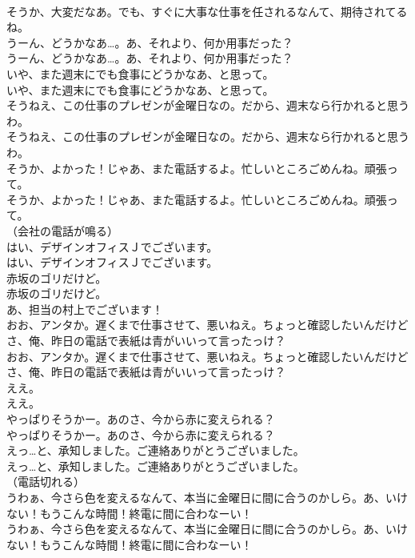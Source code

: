 \documentclass[8pt]{extreport}
\begin{document}
\begin{CJK}{UTF8}{min}
\\	そうか、大変だなあ。でも、すぐに大事な仕事を任されるなんて、期待されてるね。 
\\	うーん、どうかなあ…。あ、それより、何か用事だった？	
\\	うーん、どうかなあ…。あ、それより、何か用事だった？ 
\\	いや、また週末にでも食事にどうかなあ、と思って。	
\\	いや、また週末にでも食事にどうかなあ、と思って。 
\\	そうねえ、この仕事のプレゼンが金曜日なの。だから、週末なら行かれると思うわ。	
\\	そうねえ、この仕事のプレゼンが金曜日なの。だから、週末なら行かれると思うわ。 
\\	そうか、よかった！じゃあ、また電話するよ。忙しいところごめんね。頑張って。	
\\	そうか、よかった！じゃあ、また電話するよ。忙しいところごめんね。頑張って。 
\\	（会社の電話が鳴る）	
\\	はい、デザインオフィスＪでございます。	
\\	はい、デザインオフィスＪでございます。 
\\	赤坂のゴリだけど。	
\\	赤坂のゴリだけど。 
\\	あ、担当の村上でございます！	
\\	おお、アンタか。遅くまで仕事させて、悪いねえ。ちょっと確認したいんだけどさ、俺、昨日の電話で表紙は青がいいって言ったっけ？	
\\	おお、アンタか。遅くまで仕事させて、悪いねえ。ちょっと確認したいんだけどさ、俺、昨日の電話で表紙は青がいいって言ったっけ？ 
\\	ええ。	
\\	ええ。 
\\	やっぱりそうかー。あのさ、今から赤に変えられる？	
\\	やっぱりそうかー。あのさ、今から赤に変えられる？ 
\\	えっ…と、承知しました。ご連絡ありがとうございました。	
\\	えっ…と、承知しました。ご連絡ありがとうございました。 
\\	（電話切れる）	
\\	うわぁ、今さら色を変えるなんて、本当に金曜日に間に合うのかしら。あ、いけない！もうこんな時間！終電に間に合わなーい！	
\\	うわぁ、今さら色を変えるなんて、本当に金曜日に間に合うのかしら。あ、いけない！もうこんな時間！終電に間に合わなーい！ 

\end{CJK}
\end{document}
